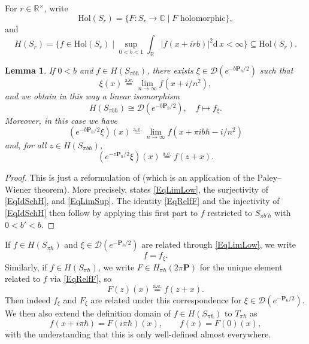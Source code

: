\documentclass[11pt, reqno]{amsart}
\newtheorem{lemma}[theorem]{Lemma}
\theoremstyle{definition}
\numberwithin{equation}{section}
\def\C{\mathbb C}
\def\msD{\mathscr D}
\def\R{\mathbb R}
\newcommand{\Pb}{\mathbf{P}}
\newcommand{\rd}{\mathrm{d}\!\,}
\newcommand{\Hol}{\mathrm{Hol}}
\begin{document}
For $r\in \R^{\times}$, write 
\[
\Hol(S_{r}) = \{F\colon  S_{r} \rightarrow \C\mid F \textrm{ holomorphic}\},
\]
and 
\[
H(S_{r})= \{f \in \Hol(S_{r}) \mid \sup_{0<b<1} \int_{\R} |f(x+ir b)|^2\rd x <\infty\} \subseteq \Hol(S_{r}) .
\]
\begin{lemma}\label{LemSch}
If $0<b$ and $f \in H(S_{\pi b\hbar})$, there exists $\xi \in \msD(e^{-b\Pb_{\hbar}/2})$ such that 
\begin{equation}\label{EqLimLow}\xi(x) \overset{\textrm{a.e.}}{=} \lim_{n\rightarrow \infty} f(x+i/n^2),
\end{equation}
and we obtain in this way a linear isomorphism 
\begin{equation}\label{EqIdSchH}
H(S_{\pi b\hbar}) \cong \msD(e^{-b\Pb_{\hbar}/2}),\quad f \mapsto f_{\xi}.
\end{equation}
Moreover, in this case we have 
\begin{equation}\label{EqLimSup}
(e^{-b\Pb_{\hbar}/2}\xi)(x) \overset{\textrm{a.e.}}{=} \lim_{n\rightarrow \infty} f(x+ \pi i b\hbar - i/n^2) 
\end{equation}
and, for all $z\in H(S_{\pi b\hbar})$, 
\begin{equation}\label{EqRelfF}
(e^{-z\Pb_{\hbar}/2}\xi)(x) \overset{\textrm{a.e.}}{=} f(z+x).
\end{equation}
\end{lemma} 
\begin{proof}
This is just a reformulation of \cite[Lemma 1.1]{Sch94} (which is an application of the Paley--Wiener theorem). More precisely, \cite[Lemma 1.1]{Sch94} states \eqref{EqLimLow}, the surjectivity of \eqref{EqIdSchH}, and \eqref{EqLimSup}. The identity \eqref{EqRelfF} and the injectivity of \eqref{EqIdSchH}  then follow by applying this first part to $f$ restricted to $S_{\pi b'\hbar}$ with $0<b'<b$. 
\end{proof}

If $f \in H(S_{\pi\hbar})$ and $\xi\in \msD(e^{-\Pb_{\hbar}/2})$ are related through \eqref{EqLimLow}, we write 
\[
f = f_{\xi}.
\]
Similarly, if $f \in H(S_{\pi\hbar})$, we write $F\in H_{\pi\hbar}(2\pi \Pb)$ for the unique element related to $f$ via \eqref{EqRelfF}, so
\begin{equation}\label{EqRelfFNew}
F(z)(x) \overset{\textrm{a.e.}}{=} f(z+x).
\end{equation}
Then indeed $f_{\xi}$ and $F_{\xi}$ are related under this correspondence for $\xi\in \msD(e^{-\Pb_{\hbar}/2})$. We then also extend the definition domain of $f\in H(S_{\pi\hbar})$ to $T_{\pi\hbar}$ as
\[
f(x+ i\pi\hbar) = F(i\pi\hbar)(x),\qquad f(x) = F(0)(x),
\]
with the understanding that this is only well-defined almost everywhere.
\end{document}
